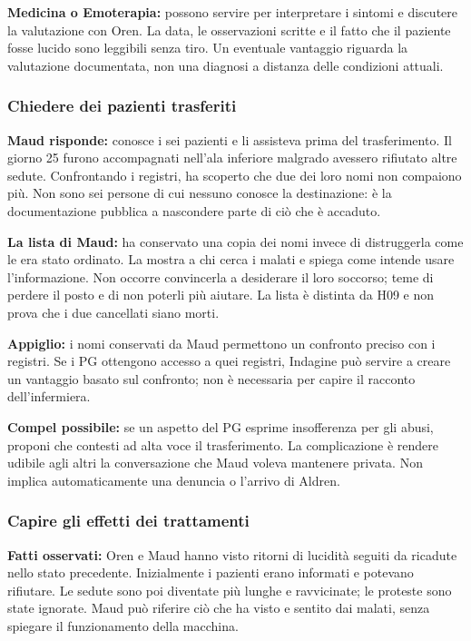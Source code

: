 \documentclass[11pt,a4paper]{article}
\begin{document}
\textbf{Medicina o Emoterapia:} possono servire per interpretare i sintomi e discutere la valutazione con Oren. La data, le osservazioni scritte e il fatto che il paziente fosse lucido sono leggibili senza tiro. Un eventuale vantaggio riguarda la valutazione documentata, non una diagnosi a distanza delle condizioni attuali.

\subsubsection{Chiedere dei pazienti trasferiti}
\textbf{Maud risponde:} conosce i sei pazienti e li assisteva prima del trasferimento. Il giorno 25 furono accompagnati nell'ala inferiore malgrado avessero rifiutato altre sedute. Confrontando i registri, ha scoperto che due dei loro nomi non compaiono più. Non sono sei persone di cui nessuno conosce la destinazione: è la documentazione pubblica a nascondere parte di ciò che è accaduto.

\textbf{La lista di Maud:} ha conservato una copia dei nomi invece di distruggerla come le era stato ordinato. La mostra a chi cerca i malati e spiega come intende usare l'informazione. Non occorre convincerla a desiderare il loro soccorso; teme di perdere il posto e di non poterli più aiutare. La lista è distinta da H09 e non prova che i due cancellati siano morti.

\begin{fatebox}
\textbf{Appiglio:} i nomi conservati da Maud permettono un confronto preciso con i registri. Se i PG ottengono accesso a quei registri, Indagine può servire a creare un vantaggio basato sul confronto; non è necessaria per capire il racconto dell'infermiera.

\textbf{Compel possibile:} se un aspetto del PG esprime insofferenza per gli abusi, proponi che contesti ad alta voce il trasferimento. La complicazione è rendere udibile agli altri la conversazione che Maud voleva mantenere privata. Non implica automaticamente una denuncia o l'arrivo di Aldren.
\end{fatebox}

\subsubsection{Capire gli effetti dei trattamenti}
\textbf{Fatti osservati:} Oren e Maud hanno visto ritorni di lucidità seguiti da ricadute nello stato precedente. Inizialmente i pazienti erano informati e potevano rifiutare. Le sedute sono poi diventate più lunghe e ravvicinate; le proteste sono state ignorate. Maud può riferire ciò che ha visto e sentito dai malati, senza spiegare il funzionamento della macchina.
\end{document}
